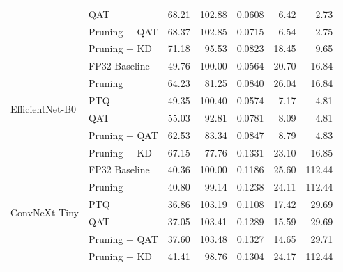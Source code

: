 \begin{table}[htbp]
{\begin{tabular}{llrrrrr}
  & QAT & 68.21 & 102.88 & 0.0608 & 6.42 & 2.73 \\
  & Pruning + QAT & 68.37 & 102.85 & 0.0715 & 6.54 & 2.75 \\
  & Pruning + KD & 71.18 & 95.53 & 0.0823 & 18.45 & 9.65 \\
\midrule
\multirow{6}{*}{EfficientNet-B0}
  & FP32 Baseline & 49.76 & 100.00 & 0.0564 & 20.70 & 16.84 \\
  & Pruning & 64.23 & 81.25 & 0.0840 & 26.04 & 16.84 \\
  & PTQ & 49.35 & 100.40 & 0.0574 & 7.17 & 4.81 \\
  & QAT & 55.03 & 92.81 & 0.0781 & 8.09 & 4.81 \\
  & Pruning + QAT & 62.53 & 83.34 & 0.0847 & 8.79 & 4.83 \\
  & Pruning + KD & 67.15 & 77.76 & 0.1331 & 23.10 & 16.85 \\
\midrule
\multirow{6}{*}{ConvNeXt-Tiny}
  & FP32 Baseline & 40.36 & 100.00 & 0.1186 & 25.60 & 112.44 \\
  & Pruning & 40.80 & 99.14 & 0.1238 & 24.11 & 112.44 \\
  & PTQ & 36.86 & 103.19 & 0.1108 & 17.42 & 29.69 \\
  & QAT & 37.05 & 103.41 & 0.1289 & 15.59 & 29.69 \\
  & Pruning + QAT & 37.60 & 103.48 & 0.1327 & 14.65 & 29.71 \\
  & Pruning + KD & 41.41 & 98.76 & 0.1304 & 24.17 & 112.44 \\
\bottomrule
\end{tabular}%
}
\end{table}